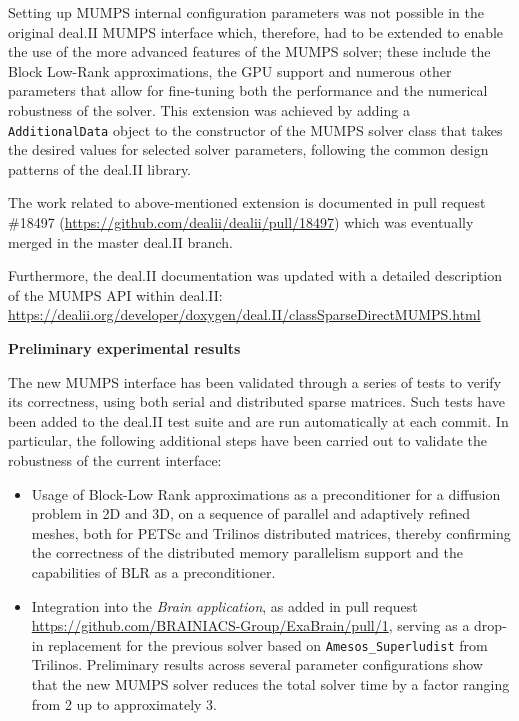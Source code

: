 \documentclass[a4paper,12pt, numbers]{article}
\begin{document}
Setting up MUMPS internal configuration parameters was not possible in
the original deal.II MUMPS interface which, therefore, had to be
extended to enable the use of the more advanced features of the MUMPS
solver; these include the Block Low-Rank approximations, the GPU
support and numerous other parameters that allow for fine-tuning both
the performance and the numerical robustness of the solver. This
extension was achieved by adding a \texttt{AdditionalData} object
to the constructor of the MUMPS solver class that takes the desired
values for selected solver parameters, following the common design
patterns of the deal.II library.

The work related to above-mentioned extension is documented in pull
request \#18497 (\url{https://github.com/dealii/dealii/pull/18497})
which was eventually merged in the master deal.II branch.

Furthermore, the deal.II documentation was updated with a detailed description
of the MUMPS API within deal.II: \url{https://dealii.org/developer/doxygen/deal.II/classSparseDirectMUMPS.html}


\noindent\textbf{Preliminary experimental results}

The new MUMPS interface has been validated through a series of tests
to verify its correctness, using both serial and distributed sparse matrices. Such tests
have been added to the deal.II test suite and are run automatically at
each commit. In particular, the following additional steps have
been carried out to validate the robustness of the current interface:
\begin{itemize}
\item Usage of Block-Low Rank approximations as a preconditioner
for a diffusion problem in 2D and 3D, on a sequence of parallel and
adaptively refined meshes, both for PETSc and Trilinos distributed matrices, thereby
confirming the correctness of the distributed memory parallelism
support and the capabilities of BLR as a preconditioner.
\item Integration into the \emph{Brain application}, as added
in pull request \url{https://github.com/BRAINIACS-Group/ExaBrain/pull/1}, serving as a
drop-in replacement for the previous solver based on \texttt{Amesos\_Superludist}
from Trilinos. Preliminary results across several
parameter configurations show that the new MUMPS solver
reduces the total solver time by a factor
ranging from 2 up to approximately 3.

\end{itemize}
\end{document}
